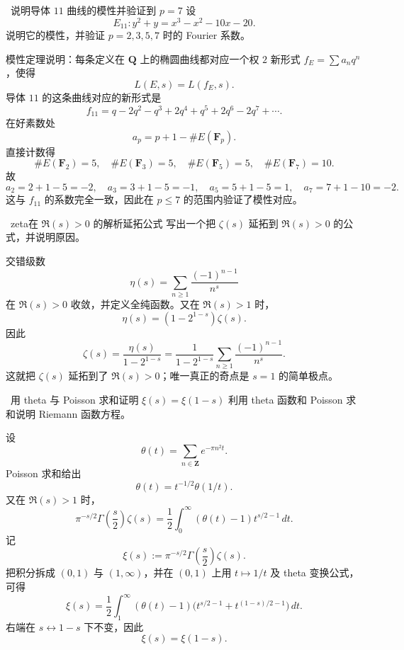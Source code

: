 \begin{problem}{\medium\ 说明导体 $11$ 曲线的模性并验证到 $p=7$}
设
\[
E_{11}: y^2+y=x^3-x^2-10x-20.
\]
说明它的模性，并验证 $p=2,3,5,7$ 时的 Fourier 系数。
\end{problem}
\begin{solution}
模性定理说明：每条定义在 $\mathbf Q$ 上的椭圆曲线都对应一个权 $2$ 新形式 $f_E=\sum a_nq^n$，使得
\[
L(E,s)=L(f_E,s).
\]
导体 $11$ 的这条曲线对应的新形式是
\[
f_{11}=q-2q^2-q^3+2q^4+q^5+2q^6-2q^7+\cdots.
\]
在好素数处
\[
a_p=p+1-\#E(\mathbf F_p).
\]
直接计数得
\[
\#E(\mathbf F_2)=5,\quad
\#E(\mathbf F_3)=5,\quad
\#E(\mathbf F_5)=5,\quad
\#E(\mathbf F_7)=10.
\]
故
\[
a_2=2+1-5=-2,\quad
a_3=3+1-5=-1,\quad
a_5=5+1-5=1,\quad
a_7=7+1-10=-2.
\]
这与 $f_{11}$ 的系数完全一致，因此在 $p\le7$ 的范围内验证了模性对应。
\end{solution}

\begin{problem}{\medium\ zeta在 $\Re(s)>0$ 的解析延拓公式}
写出一个把 $\zeta(s)$ 延拓到 $\Re(s)>0$ 的公式，并说明原因。
\end{problem}
\begin{solution}
交错级数
\[
\eta(s)=\sum_{n\ge1}\frac{(-1)^{n-1}}{n^s}
\]
在 $\Re(s)>0$ 收敛，并定义全纯函数。又在 $\Re(s)>1$ 时，
\[
\eta(s)=(1-2^{1-s})\zeta(s).
\]
因此
\[
\zeta(s)=\frac{\eta(s)}{1-2^{1-s}}
=\frac{1}{1-2^{1-s}}\sum_{n\ge1}\frac{(-1)^{n-1}}{n^s}.
\]
这就把 $\zeta(s)$ 延拓到了 $\Re(s)>0$；唯一真正的奇点是 $s=1$ 的简单极点。
\end{solution}

\begin{problem}{\medium\ 用 theta 与 Poisson 求和证明 $\xi(s)=\xi(1-s)$}
利用 theta 函数和 Poisson 求和说明 Riemann 函数方程。
\end{problem}
\begin{solution}
设
\[
\theta(t)=\sum_{n\in \mathbf Z}e^{-\pi n^2t}.
\]
Poisson 求和给出
\[
\theta(t)=t^{-1/2}\theta(1/t).
\]
又在 $\Re(s)>1$ 时，
\[
\pi^{-s/2}\Gamma\!\left(\frac s2\right)\zeta(s)
=
\frac12\int_0^\infty (\theta(t)-1)t^{s/2-1}\,dt.
\]
记
\[
\xi(s):=\pi^{-s/2}\Gamma\!\left(\frac s2\right)\zeta(s).
\]
把积分拆成 $(0,1)$ 与 $(1,\infty)$，并在 $(0,1)$ 上用 $t\mapsto 1/t$ 及 theta 变换公式，可得
\[
\xi(s)=\frac12\int_1^\infty (\theta(t)-1)\bigl(t^{s/2-1}+t^{(1-s)/2-1}\bigr)\,dt.
\]
右端在 $s\leftrightarrow 1-s$ 下不变，因此
\[
\xi(s)=\xi(1-s).
\]
\end{solution}

